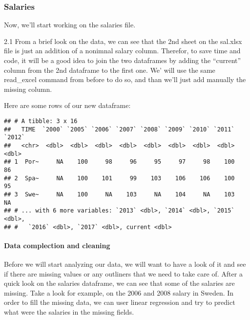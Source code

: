\documentclass[]{article}
\newenvironment{Shaded}{\begin{snugshade}}{\end{snugshade}}
\newcommand{\KeywordTok}[1]{\textcolor[rgb]{0.13,0.29,0.53}{\textbf{#1}}}
\newcommand{\DataTypeTok}[1]{\textcolor[rgb]{0.13,0.29,0.53}{#1}}
\newcommand{\DecValTok}[1]{\textcolor[rgb]{0.00,0.00,0.81}{#1}}
\newcommand{\StringTok}[1]{\textcolor[rgb]{0.31,0.60,0.02}{#1}}
\newcommand{\OperatorTok}[1]{\textcolor[rgb]{0.81,0.36,0.00}{\textbf{#1}}}
\newcommand{\NormalTok}[1]{#1}
\let\oldparagraph\paragraph
\renewcommand{\paragraph}[1]{\oldparagraph{#1}\mbox{}}
\begin{document}
\subsubsection{Salaries}\label{salaries}

Now, we'll start working on the salaries file.

2.1 From a brief look on the data, we can see that the 2nd sheet on the
sal.xlsx file is just an addition of a nonimnal salary column. Therefor,
to save time and code, it will be a good idea to join the two dataframes
by adding the ``current'' column from the 2nd dataframe to the first
one. We' will use the same read\_excel command from before to do so, and
than we'll just add manually the missing column.

\begin{Shaded}
\end{Shaded}

Here are some rows of our new dataframe:

\begin{verbatim}
## # A tibble: 3 x 16
##   TIME  `2000` `2005` `2006` `2007` `2008` `2009` `2010` `2011` `2012`
##   <chr>  <dbl>  <dbl>  <dbl>  <dbl>  <dbl>  <dbl>  <dbl>  <dbl>  <dbl>
## 1  Por~     NA    100     98     96     95     97     98    100     86
## 2  Spa~     NA    100    101     99    103    106    106    100     95
## 3  Swe~     NA    100     NA    103     NA    104     NA    103     NA
## # ... with 6 more variables: `2013` <dbl>, `2014` <dbl>, `2015` <dbl>,
## #   `2016` <dbl>, `2017` <dbl>, current <dbl>
\end{verbatim}

\paragraph{Data complection and
cleaning}\label{data-complection-and-cleaning}

Before we will start analyzing our data, we will want to have a look of
it and see if there are missing values or any outliners that we need to
take care of. After a quick look on the salaries dataframe, we can see
that some of the salaries are missing. Take a look for example, on the
2006 and 2008 salary in Sweden. In order to fill the missing data, we
can user linear regression and try to predict what were the salaries in
the missing fields.
\end{document}

